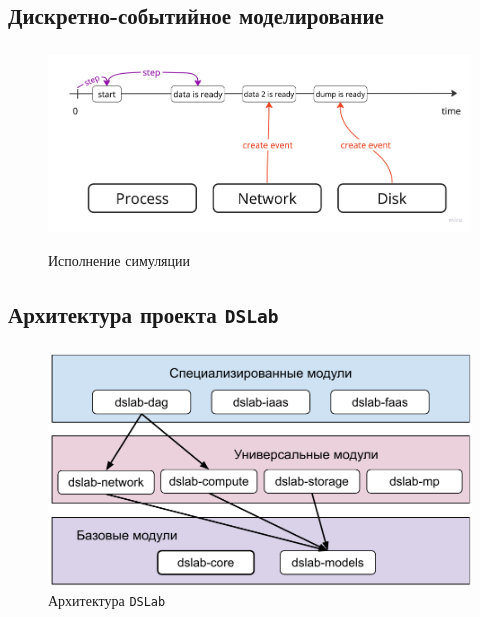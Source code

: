 \documentclass[t]{beamer}  %
\begin{document}
	\subsection{Дискретно-событийное моделирование}

    \begin{frame}
    \frametitle{\insertsection} 
	\framesubtitle{\insertsubsection}

	\begin{figure}
		\centering
		\includegraphics[width=\linewidth]{images/event_pipeline_6}
		\label{simulation}
		\caption*{Исполнение симуляции}
	\end{figure}
    \end{frame}

	\subsection{Архитектура проекта \texttt{DSLab}}
	\begin{frame}
		\frametitle{\insertsection} 
		\framesubtitle{\insertsubsection}

		\begin{figure}[H]
			\centering
			\includegraphics[width=0.9\linewidth]{images/dslab_arc}
			\caption*{Архитектура \texttt{DSLab}}
			\label{dslab_arc}
		\end{figure}
	\end{frame}
\end{document}
